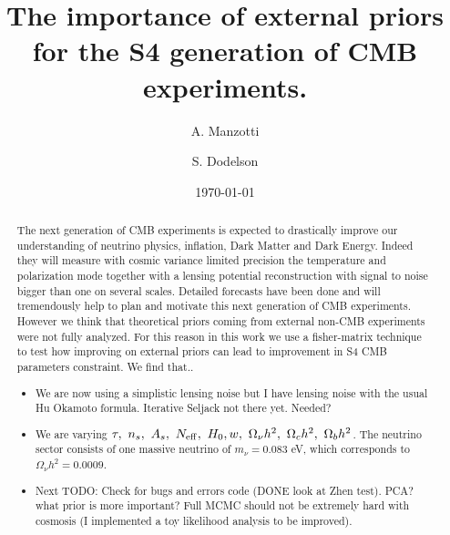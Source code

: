 \documentclass[aps,prd,preprint,groupedaddress]{revtex4-1}
\begin{document}
\graphicspath{{../images/}}


\title{The importance of external priors for the S4 generation of CMB experiments.}

\author{A. Manzotti}
\author{S. Dodelson}


\date{\today}

\begin{abstract}
The next generation of CMB experiments is expected to drastically improve our understanding of neutrino physics, inflation, Dark Matter and Dark Energy.
Indeed they will measure with cosmic variance limited precision the temperature and polarization mode together with a lensing potential reconstruction with signal to noise bigger than one on several scales. Detailed forecasts have been done and will tremendously help to plan and motivate this next generation of CMB experiments. However we think that theoretical priors coming from external non-CMB experiments were not fully analyzed. For this reason in this work we use a fisher-matrix technique to test how improving on external priors can lead to improvement in S4 CMB parameters constraint. We find that.. 

\begin{itemize}
\item We are now using a simplistic lensing noise but I have lensing noise with the usual Hu Okamoto formula. Iterative Seljack not there yet. Needed?
\item We are varying $\tau, ~ n_{s}, ~ A_{s}, ~ N_{\rm eff}, ~ H_{0}, w,~\Omega_{\nu}h^{2},~\Omega_{c}h^{2},~\Omega_{b}h^{2}$. The neutrino sector consists of one massive neutrino of $m_{\nu}=0.083$ eV, which corresponds to $\Omega_{\nu}h^{2}=0.0009$.
\item Next TODO: Check for bugs and errors code (DONE look at Zhen test). PCA? what prior is more important? Full MCMC should not be extremely hard with cosmosis (I implemented a toy likelihood analysis to be improved).
\end{itemize}


\end{abstract}
\end{document}
